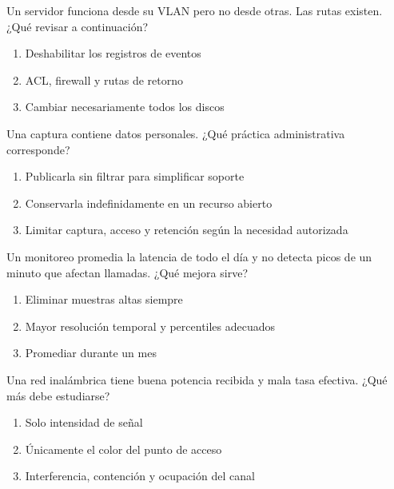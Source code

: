 \noindent\begin{minipage}{\linewidth}\setlength{\parskip}{4pt}\label{q:R-052}
Un servidor funciona desde su VLAN pero no desde otras. Las rutas existen. ¿Qué revisar a continuación?
\begin{enumerate}[label=\Alph*),nosep]
\item Deshabilitar los registros de eventos
\item ACL, firewall y rutas de retorno
\item Cambiar necesariamente todos los discos
\end{enumerate}\end{minipage}\par\medskip

\noindent\begin{minipage}{\linewidth}\setlength{\parskip}{4pt}\label{q:R-053}
Una captura contiene datos personales. ¿Qué práctica administrativa corresponde?
\begin{enumerate}[label=\Alph*),nosep]
\item Publicarla sin filtrar para simplificar soporte
\item Conservarla indefinidamente en un recurso abierto
\item Limitar captura, acceso y retención según la necesidad autorizada
\end{enumerate}\end{minipage}\par\medskip

\noindent\begin{minipage}{\linewidth}\setlength{\parskip}{4pt}\label{q:R-054}
Un monitoreo promedia la latencia de todo el día y no detecta picos de un minuto que afectan llamadas. ¿Qué mejora sirve?
\begin{enumerate}[label=\Alph*),nosep]
\item Eliminar muestras altas siempre
\item Mayor resolución temporal y percentiles adecuados
\item Promediar durante un mes
\end{enumerate}\end{minipage}\par\medskip

\noindent\begin{minipage}{\linewidth}\setlength{\parskip}{4pt}\label{q:R-055}
Una red inalámbrica tiene buena potencia recibida y mala tasa efectiva. ¿Qué más debe estudiarse?
\begin{enumerate}[label=\Alph*),nosep]
\item Solo intensidad de señal
\item Únicamente el color del punto de acceso
\item Interferencia, contención y ocupación del canal
\end{enumerate}\end{minipage}\par\medskip

